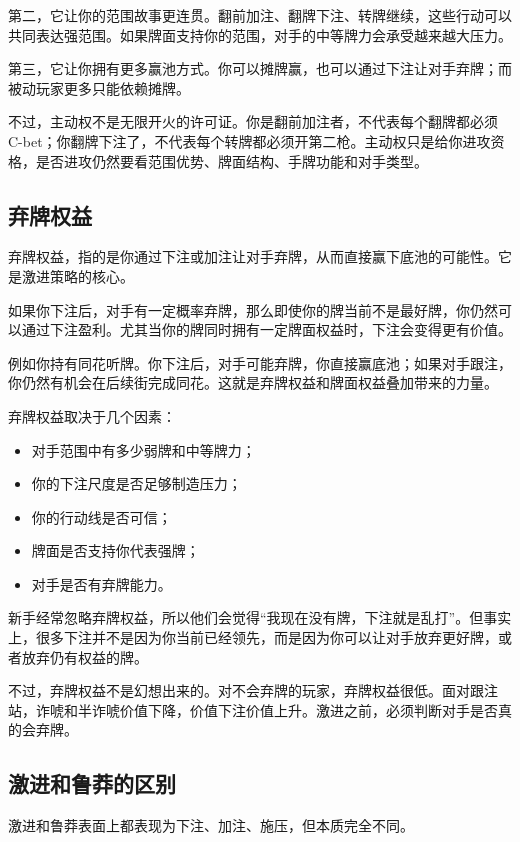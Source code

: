 第二，它让你的范围故事更连贯。翻前加注、翻牌下注、转牌继续，这些行动可以共同表达强范围。如果牌面支持你的范围，对手的中等牌力会承受越来越大压力。

第三，它让你拥有更多赢池方式。你可以摊牌赢，也可以通过下注让对手弃牌；而被动玩家更多只能依赖摊牌。

不过，主动权不是无限开火的许可证。你是翻前加注者，不代表每个翻牌都必须 C-bet；你翻牌下注了，不代表每个转牌都必须开第二枪。主动权只是给你进攻资格，是否进攻仍然要看范围优势、牌面结构、手牌功能和对手类型。

\subsection{弃牌权益}

弃牌权益，指的是你通过下注或加注让对手弃牌，从而直接赢下底池的可能性。它是激进策略的核心。

如果你下注后，对手有一定概率弃牌，那么即使你的牌当前不是最好牌，你仍然可以通过下注盈利。尤其当你的牌同时拥有一定牌面权益时，下注会变得更有价值。

例如你持有同花听牌。你下注后，对手可能弃牌，你直接赢底池；如果对手跟注，你仍然有机会在后续街完成同花。这就是弃牌权益和牌面权益叠加带来的力量。

弃牌权益取决于几个因素：

\begin{itemize}
\item 对手范围中有多少弱牌和中等牌力；
\item 你的下注尺度是否足够制造压力；
\item 你的行动线是否可信；
\item 牌面是否支持你代表强牌；
\item 对手是否有弃牌能力。
\end{itemize}

新手经常忽略弃牌权益，所以他们会觉得“我现在没有牌，下注就是乱打”。但事实上，很多下注并不是因为你当前已经领先，而是因为你可以让对手放弃更好牌，或者放弃仍有权益的牌。

不过，弃牌权益不是幻想出来的。对不会弃牌的玩家，弃牌权益很低。面对跟注站，诈唬和半诈唬价值下降，价值下注价值上升。激进之前，必须判断对手是否真的会弃牌。

\subsection{激进和鲁莽的区别}

激进和鲁莽表面上都表现为下注、加注、施压，但本质完全不同。

